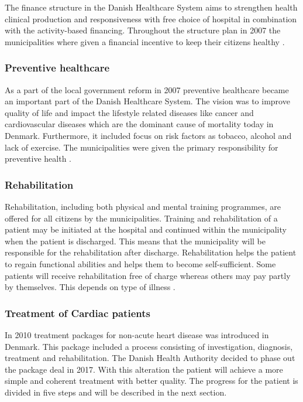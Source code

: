 The finance structure in the Danish Healthcare System aims to strengthen health clinical production and responsiveness with free choice of hospital in combination with the activity-based financing. Throughout the structure plan in 2007 the municipalities where given a financial incentive to keep their citizens healthy \cite{DKhealthreview}.

\subsubsection{Preventive healthcare}

As a part of the local government reform in 2007 preventive healthcare became an important part of the Danish Healthcare System. The vision was to improve quality of life and impact the lifestyle related diseases like cancer and cardiovascular diseases which are the dominant cause of mortality today in Denmark. Furthermore, it included focus on risk factors as tobacco, alcohol and lack of exercise. The municipalities were given the primary responsibility for preventive health \cite{sundhedsministeriet}.

\subsubsection{Rehabilitation}

Rehabilitation, including both physical and mental training programmes, are offered for all citizens by the municipalities. Training and rehabilitation of a patient may be initiated at the hospital and continued within the municipality when the patient is discharged. This means that the municipality will be responsible for the rehabilitation after discharge. Rehabilitation helps the patient to regain functional abilities and helps them to become self-sufficient. Some patients will receive rehabilitation free of charge whereas others may pay partly by themselves. This depends on type of illness \cite{Healthcareindk2, retningsrehab, WHO}.


 


\subsubsection{Treatment of Cardiac patients}

In 2010 treatment packages for non-acute heart disease was introduced in Denmark. This package included a process consisting of investigation, diagnosis, treatment and rehabilitation. The Danish Health Authority decided to phase out the package deal in 2017. With this alteration the patient will achieve a more simple and coherent treatment with better quality. 
The progress for the patient is divided in five steps and will be described in the next section. \\

